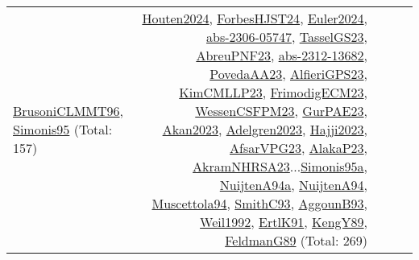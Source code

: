 {\begin{longtable}{p{3cm}r>{\raggedright\arraybackslash}p{6cm}>{\raggedright\arraybackslash}p{6cm}>{\raggedright\arraybackslash}p{8cm}}
\hyperref[detail:BrusoniCLMMT96]{BrusoniCLMMT96}, \hyperref[detail:Simonis95]{Simonis95} (Total: 157) & \hyperref[detail:Houten2024]{Houten2024}, \hyperref[detail:ForbesHJST24]{ForbesHJST24}, \hyperref[detail:Euler2024]{Euler2024}, \hyperref[detail:abs-2306-05747]{abs-2306-05747}, \hyperref[detail:TasselGS23]{TasselGS23}, \hyperref[detail:AbreuPNF23]{AbreuPNF23}, \hyperref[detail:abs-2312-13682]{abs-2312-13682}, \hyperref[detail:PovedaAA23]{PovedaAA23}, \hyperref[detail:AlfieriGPS23]{AlfieriGPS23}, \hyperref[detail:KimCMLLP23]{KimCMLLP23}, \hyperref[detail:FrimodigECM23]{FrimodigECM23}, \hyperref[detail:WessenCSFPM23]{WessenCSFPM23}, \hyperref[detail:GurPAE23]{GurPAE23}, \hyperref[detail:Akan2023]{Akan2023}, \hyperref[detail:Adelgren2023]{Adelgren2023}, \hyperref[detail:Hajji2023]{Hajji2023}, \hyperref[detail:AfsarVPG23]{AfsarVPG23}, \hyperref[detail:AlakaP23]{AlakaP23}, \hyperref[detail:AkramNHRSA23]{AkramNHRSA23}...\hyperref[detail:Simonis95a]{Simonis95a}, \hyperref[detail:NuijtenA94a]{NuijtenA94a}, \hyperref[detail:NuijtenA94]{NuijtenA94}, \hyperref[detail:Muscettola94]{Muscettola94}, \hyperref[detail:SmithC93]{SmithC93}, \hyperref[detail:AggounB93]{AggounB93}, \hyperref[detail:Weil1992]{Weil1992}, \hyperref[detail:ErtlK91]{ErtlK91}, \hyperref[detail:KengY89]{KengY89}, \hyperref[detail:FeldmanG89]{FeldmanG89} (Total: 269)\\
\end{longtable}
}

\clearpage
